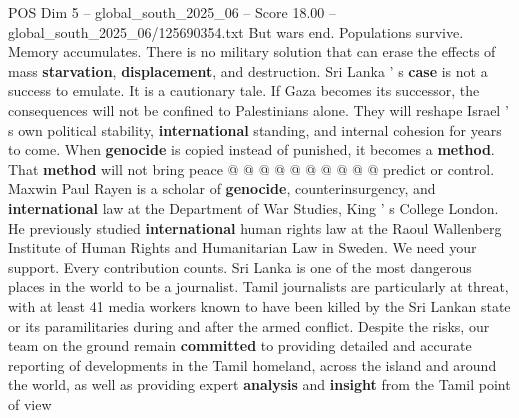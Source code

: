 \begin{textsample}{POS Dim 5 – global\_south\_2025\_06 – Score 18.00 – global\_south\_2025\_06/125690354.txt}
But wars end.
Populations survive.
Memory accumulates.
There is no military solution that can erase the effects of mass \textbf{starvation}, \textbf{displacement}, and destruction.
Sri Lanka ' s \textbf{case} is not a success to emulate.
It is a cautionary tale.
If Gaza becomes its successor, the consequences will not be confined to Palestinians alone.
They will reshape Israel ' s own political stability, \textbf{international} standing, and internal cohesion for years to come.
When \textbf{genocide} is copied instead of punished, it becomes a \textbf{method}.
That \textbf{method} will not bring peace @ @ @ @ @ @ @ @ @ @ predict or control.
Maxwin Paul Rayen is a scholar of \textbf{genocide}, counterinsurgency, and \textbf{international} law at the Department of War Studies, King ' s College London.
He previously studied \textbf{international} human rights law at the Raoul Wallenberg Institute of Human Rights and Humanitarian Law in Sweden.
We need your support.
Every contribution counts.
Sri Lanka is one of the most dangerous places in the world to be a journalist.
Tamil journalists are particularly at threat, with at least 41 media workers known to have been killed by the Sri Lankan state or its paramilitaries during and after the armed conflict.
Despite the risks, our team on the ground remain \textbf{committed} to providing detailed and accurate reporting of developments in the Tamil homeland, across the island and around the world, as well as providing expert \textbf{analysis} and \textbf{insight} from the Tamil point of view

\end{textsample}
